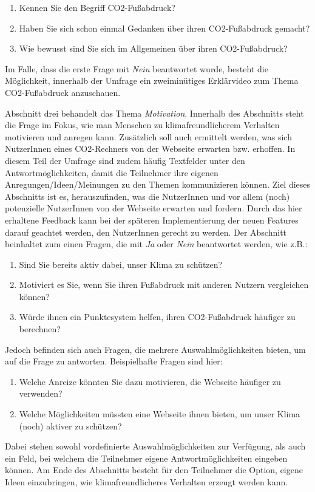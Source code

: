 \begin{enumerate}
    \item Kennen Sie den Begriff CO2-Fußabdruck?
    \item Haben Sie sich schon einmal Gedanken über ihren CO2-Fußabdruck gemacht?
    \item Wie bewusst sind Sie sich im Allgemeinen über ihren CO2-Fußabdruck?
\end{enumerate}

Im Falle, dass die erste Frage mit \textit{Nein} beantwortet wurde, besteht die Möglichkeit, innerhalb der Umfrage ein zweiminütiges Erklärvideo zum Thema CO2-Fußabdruck anzuschauen.

Abschnitt drei behandelt das Thema \textit{Motivation}.
Innerhalb des Abschnitts steht die Frage im Fokus, wie man Menschen zu klimafreundlicherem Verhalten motivieren und anregen kann.
Zusätzlich soll auch ermittelt werden, was sich NutzerInnen eines CO2-Rechners von der Webseite erwarten bzw. erhoffen.
In diesem Teil der Umfrage sind zudem häufig Textfelder unter den Antwortmöglichkeiten, damit die Teilnehmer ihre eigenen Anregungen/Ideen/Meinungen zu den Themen kommunizieren können.
Ziel dieses Abschnitts ist es, herauszufinden, was die NutzerInnen und vor allem (noch) potenzielle NutzerInnen von der Webseite erwarten und fordern.
Durch das hier erhaltene Feedback kann bei der späteren Implementierung der neuen Features darauf geachtet werden, den NutzerInnen gerecht zu werden.
Der Abschnitt beinhaltet zum einen Fragen, die mit \textit{Ja} oder \textit{Nein} beantwortet werden, wie z.B.:

\begin{enumerate}
    \item Sind Sie bereits aktiv dabei, unser Klima zu schützen?
    \item Motiviert es Sie, wenn Sie ihren Fußabdruck mit anderen Nutzern vergleichen können?
    \item Würde ihnen ein Punktesystem helfen, ihren CO2-Fußabdruck häufiger zu berechnen?
\end{enumerate}
Jedoch befinden sich auch Fragen, die mehrere Auswahlmöglichkeiten bieten, um auf die Frage zu antworten.
Beispielhafte Fragen sind hier:
\begin{enumerate}
    \item Welche Anreize könnten Sie dazu motivieren, die Webseite häufiger zu verwenden?
    \item Welche Möglichkeiten müssten eine Webseite ihnen bieten, um unser Klima (noch) aktiver zu schützen?
\end{enumerate}
Dabei stehen sowohl vordefinierte Auswahlmöglichkeiten zur Verfügung, als auch ein Feld, bei welchem die Teilnehmer eigene Antwortmöglichkeiten eingeben können.
Am Ende des Abschnitts besteht für den Teilnehmer die Option, eigene Ideen einzubringen, wie klimafreundlicheres Verhalten erzeugt werden kann.

